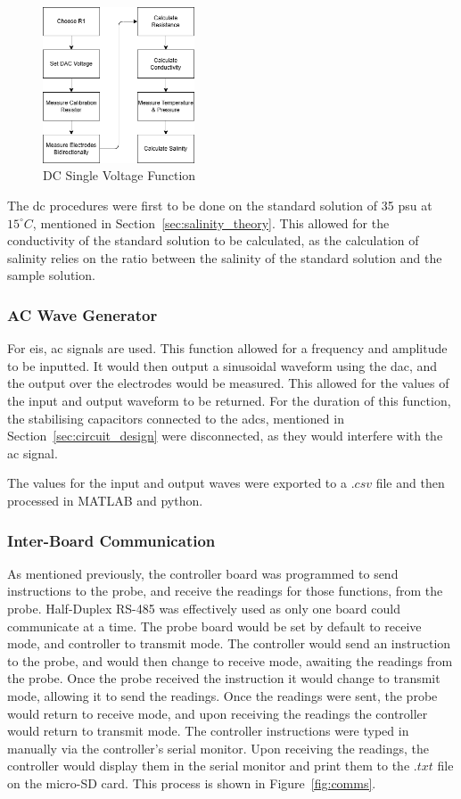 \begin{figure}[H]
    \centering
    \includegraphics[width=0.4\textwidth]{figures/dcpoint.png}
    \caption{DC Single Voltage Function}
    \label{fig:dcpoint}
\end{figure}

The \gls{dc} procedures were first to be done on the standard solution of 35 \gls{psu} at $15^{\circ}C$, mentioned in Section~\ref{sec:salinity_theory}.
This allowed for the conductivity of the standard solution to be calculated, as the calculation of salinity relies on the ratio between the salinity of the standard solution and the sample solution.

\subsubsection{AC Wave Generator}
For \gls{eis}, \gls{ac} signals are used. This function allowed for a frequency and amplitude to be inputted.
It would then output a sinusoidal waveform using the \gls{dac}, and the output over the electrodes would be measured.
This allowed for the values of the input and output waveform to be returned.
For the duration of this function, the stabilising capacitors connected to the \gls{adc}s, mentioned in Section~\ref{sec:circuit_design} were disconnected, as they would interfere with the \gls{ac} signal.

The values for the input and output waves were exported to a $.csv$ file and then processed in MATLAB and python.

\subsubsection{Inter-Board Communication}
As mentioned previously, the controller board was programmed to send instructions to the probe, and receive the readings for those functions, from the probe.
Half-Duplex RS-485 was effectively used as only one board could communicate at a time.
The probe board would be set by default to receive mode, and controller to transmit mode.
The controller would send an instruction to the probe, and would then change to receive mode, awaiting the readings from the probe.
Once the probe received the instruction it would change to transmit mode, allowing it to send the readings.
Once the readings were sent, the probe would return to receive mode, and upon receiving the readings the controller would return to transmit mode.
The controller instructions were typed in manually via the controller's serial monitor.
Upon receiving the readings, the controller would display them in the serial monitor and print them to the $.txt$ file on the micro-SD card.
This process is shown in Figure~\ref{fig:comms}.

